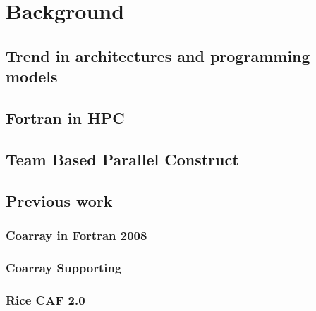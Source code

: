 \chapter{Background}\label{chap:Background}
\section{Trend in architectures and programming models}
\section{Fortran in HPC}
\section{Team Based Parallel Construct}
\section{Previous work}
\subsection{Coarray in Fortran 2008}
\subsection{Coarray Supporting}
\subsection{Rice CAF 2.0}